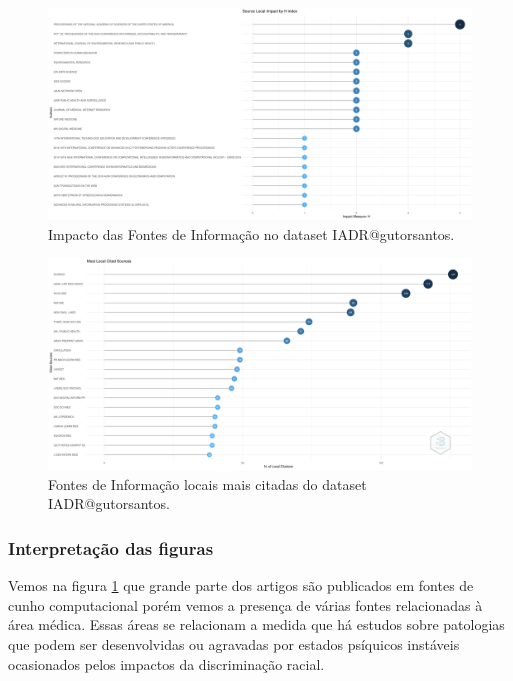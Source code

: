 \begin{figure}[H]
    \centering
    \includegraphics[angle=0,width=1\textwidth]{experiments/gutorsantos/AnaliseBibliometrica/IAeDiscriminacao/imgs/SourceImpact-2022-02-09.png}
    \caption{Impacto das Fontes de Informação no dataset IADR@gutorsantos.}
    \label{fig:IADR@gutorsantos:SourceImpact}
\end{figure}

\begin{figure}[H]
    \centering
    \includegraphics[angle=0,width=1\textwidth]{experiments/gutorsantos/AnaliseBibliometrica/IAeDiscriminacao/imgs/MostLocalCitedSources-2022-02-09.png}
    \caption{Fontes de Informação locais mais citadas do dataset IADR@gutorsantos.}
    \label{fig:IADR@gutorsantos:MostCitedSources}
\end{figure}

\subsubsection{Interpretação das figuras }
Vemos na figura \ref{fig:IADR@gutorsantos:SourceImpact} que grande parte dos artigos são publicados em fontes de cunho computacional porém vemos a presença de várias fontes relacionadas à área médica. Essas áreas se relacionam a medida que há estudos sobre patologias que podem ser desenvolvidas ou agravadas por estados psíquicos instáveis ocasionados pelos impactos da discriminação racial.

